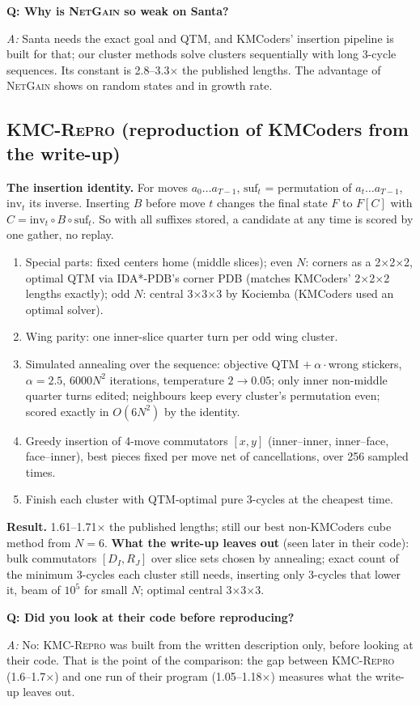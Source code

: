 \documentclass[10.5pt,a4paper]{article}
\newcommand{\Cu}[1]{#1$\times$#1$\times$#1}
\newcommand{\M}[1]{\textsc{#1}}
\newcommand{\Q}[1]{\par\smallskip\textbf{Q: #1}\par}
\newcommand{\A}{\textit{A:} }
\begin{document}
\Q{Why is \M{NetGain} so weak on Santa?} \A Santa needs the exact goal and QTM, and KMCoders' insertion pipeline is built for that;
our cluster methods solve clusters sequentially with long 3-cycle sequences. Its constant is 2.8--3.3$\times$ the published lengths.
The advantage of \M{NetGain} shows on random states and in growth rate.

\subsection{\M{KMC-Repro} (reproduction of KMCoders from the write-up)}
\textbf{The insertion identity.} For moves $a_0\ldots a_{T-1}$, $\mathrm{suf}_t$ = permutation of $a_t\ldots a_{T-1}$,
$\mathrm{inv}_t$ its inverse. Inserting $B$ before move $t$ changes the final state $F$ to $F[C]$ with
$C=\mathrm{inv}_t\circ B\circ\mathrm{suf}_t$. So with all suffixes stored, a candidate at any time is scored by one gather, no replay.
\begin{enumerate}
\item Special parts: fixed centers home (middle slices); even $N$: corners as a \Cu{2}, optimal QTM via \M{IDA*-PDB}'s corner PDB
(matches KMCoders' \Cu{2} lengths exactly); odd $N$: central \Cu{3} by Kociemba (KMCoders used an optimal solver).
\item Wing parity: one inner-slice quarter turn per odd wing cluster.
\item Simulated annealing over the sequence: objective QTM $+\ \alpha\cdot$wrong stickers, $\alpha=2.5$, $6000N^2$ iterations,
temperature $2\to0.05$; only inner non-middle quarter turns edited; neighbours keep every cluster's permutation even; scored exactly in
$O(6N^2)$ by the identity.
\item Greedy insertion of 4-move commutators $[x,y]$ (inner--inner, inner--face, face--inner), best pieces fixed per move net of
cancellations, over 256 sampled times.
\item Finish each cluster with QTM-optimal pure 3-cycles at the cheapest time.
\end{enumerate}
\textbf{Result.} 1.61--1.71$\times$ the published lengths; still our best non-KMCoders cube method from $N=6$. \textbf{What the
write-up leaves out} (seen later in their code): bulk commutators $[D_I,R_J]$ over slice sets chosen by annealing; exact count of
the minimum 3-cycles each cluster still needs, inserting only 3-cycles that lower it, beam of $10^5$ for small $N$; optimal central
\Cu{3}.

\Q{Did you look at their code before reproducing?} \A No: \M{KMC-Repro} was built from the written description only, before
looking at their code. That is the point of the comparison: the gap between \M{KMC-Repro} (1.6--1.7$\times$) and one run of their
program (1.05--1.18$\times$) measures what the write-up leaves out.
\end{document}
